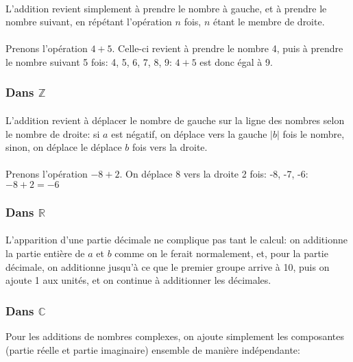 \documentclass[a4paper]{book}
\begin{document}
    \paragraph{}
    L'addition revient simplement à prendre le nombre à gauche, et à prendre le nombre suivant, en répétant l'opération $n$ fois, $n$ étant le membre de droite.
    \paragraph{}
    Prenons l'opération $4 + 5$.
    Celle-ci revient à prendre le nombre 4, puis à prendre le nombre suivant 5 fois: 4, 5, 6, 7, 8, 9: $4 + 5$ est donc égal à 9.
    \subsubsection{Dans $\mathds{Z}$}
    \paragraph{}
    L'addition revient à déplacer le nombre de gauche sur la ligne des nombres selon le nombre de droite: 
    si $a$ est négatif, on déplace vers la gauche $|b|$ fois le nombre, sinon, on déplace le déplace $b$ fois vers la droite.
    \paragraph{}
    Prenons l'opération $-8 + 2$. On déplace $8$ vers la droite 2 fois: -8, -7, -6: $-8 + 2 = -6$
    \subsubsection{Dans $\mathds{R}$}
    \paragraph{}
    L'apparition d'une partie décimale ne complique pas tant le calcul: on additionne la partie entière de $a$ et $b$ comme on le ferait normalement, et, pour la partie décimale, on additionne jusqu'à ce que le premier groupe arrive à 10, puis on ajoute 1 aux unités, et on continue à additionner les décimales.
    \subsubsection{Dans $\mathds{C}$}
    Pour les additions de nombres complexes, on ajoute simplement les composantes (partie réelle et partie imaginaire) ensemble de manière indépendante: 
    
\end{document}
